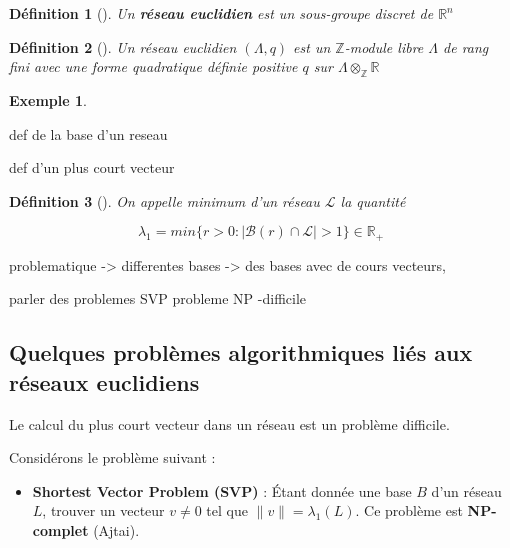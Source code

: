 \documentclass[a4paper,12pt]{report}  %
\theoremstyle{definitionstyle}
\newtheorem{definition}{Définition}[chapter] %
\theoremstyle{examplestyle}
\newtheorem{example}{Exemple}[chapter] %
\theoremstyle{remarkstyle}
\begin{document}
	\begin{definition}[\cite{clef_unique_1}]
		Un \textbf{réseau euclidien} est un sous-groupe discret de $\mathbb{R}^n$
	\end{definition}


	\begin{definition}[\cite{clef_unique_2}]
		Un réseau euclidien $(\Lambda, q)$ est un $\mathbb{Z}$-module libre $\Lambda$ de rang fini avec une forme quadratique définie positive $q$ sur $\Lambda \otimes_\mathbb{Z} \mathbb{R}$ 
	\end{definition}
	
	
	
	\begin{example}
		
	\end{example}
	def de la base d'un reseau
	
	def d'un plus court vecteur
	
	\begin{definition}[\cite{clef_unique_1}]
		On appelle minimum d'un réseau $\mathcal{L}$ la quantité
		
		$$\lambda_1 = min\{r>0 : |\mathcal{B}(r)\cap\mathcal{L}|>1\} \in \mathbb{R_+}$$
	\end{definition}
	
	
	problematique -> differentes bases -> des bases avec de cours vecteurs,
	
	
	
	
	parler des problemes SVP
	 probleme NP -difficile
	
	\subsection{Quelques problèmes algorithmiques liés aux réseaux euclidiens}
	
	Le calcul du plus court vecteur dans un réseau est un problème difficile.
	
	Considérons le problème suivant :
	
	\begin{itemize}
		\item \textbf{Shortest Vector Problem (SVP)} : Étant donnée une base $B$ d’un réseau $L$, trouver un vecteur $v \neq 0$ tel que $\|v\| = \lambda_1(L)$. Ce problème est \textbf{NP-complet} (Ajtai).
	\end{itemize}
	
\end{document}
